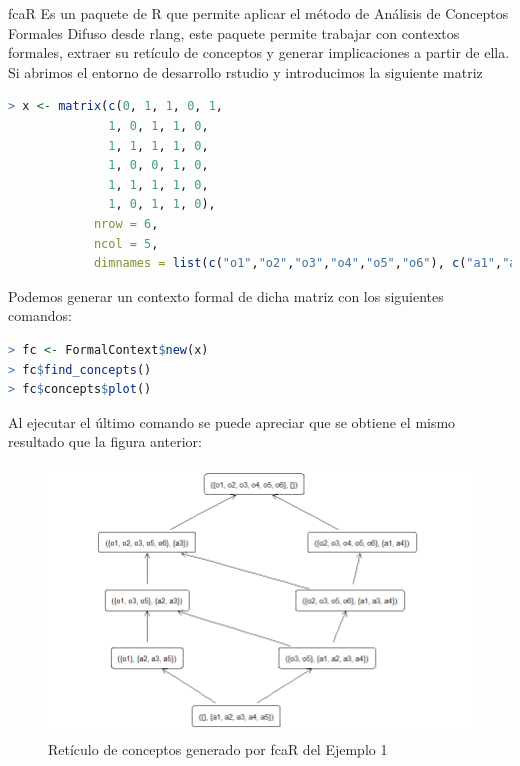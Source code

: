 \documentclass[../../main.tex]{subfiles}
\begin{document}
fcaR\cite{doc4}  Es un paquete de R que permite aplicar el método de Análisis de Conceptos Formales Difuso desde \gls{rlang}, este paquete permite trabajar con contextos formales, extraer su retículo de conceptos y generar implicaciones a partir de ella. \\

Si abrimos el entorno de desarrollo \gls{rstudio} y introducimos la siguiente matriz 

\begin{lstlisting}[language=R]
> x <- matrix(c(0, 1, 1, 0, 1,
              1, 0, 1, 1, 0,
              1, 1, 1, 1, 0,
              1, 0, 0, 1, 0,
              1, 1, 1, 1, 0,
              1, 0, 1, 1, 0), 
            nrow = 6, 
            ncol = 5, 
            dimnames = list(c("o1","o2","o3","o4","o5","o6"), c("a1","a2","a3","a4","a5")))
\end{lstlisting}

\vskip 0.2in

Podemos generar un contexto formal de dicha matriz con los siguientes comandos:
\begin{lstlisting}[language=R]
> fc <- FormalContext$new(x)
> fc$find_concepts()
> fc$concepts$plot()
\end{lstlisting}

\vskip 0.2in

\newpage

Al ejecutar el último comando se puede apreciar que se obtiene el mismo resultado que la figura anterior:
\begin{figure}[H]
\centering
\includegraphics[width=1\textwidth]{images/fca/reticulo2.png}
\caption{Retículo de conceptos generado por fcaR del Ejemplo 1}
\end{figure}
\end{document}
